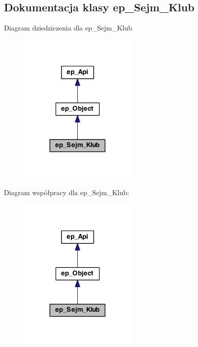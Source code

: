 \hypertarget{classep___sejm___klub}{\subsection{Dokumentacja klasy ep\-\_\-\-Sejm\-\_\-\-Klub}
\label{classep___sejm___klub}
}


Diagram dziedziczenia dla ep\-\_\-\-Sejm\-\_\-\-Klub\nopagebreak
\begin{figure}[H]
\begin{center}
\leavevmode
\includegraphics[width=164pt]{classep___sejm___klub__inherit__graph}
\end{center}
\end{figure}


Diagram współpracy dla ep\-\_\-\-Sejm\-\_\-\-Klub\-:\nopagebreak
\begin{figure}[H]
\begin{center}
\leavevmode
\includegraphics[width=164pt]{classep___sejm___klub__coll__graph}
\end{center}
\end{figure}
